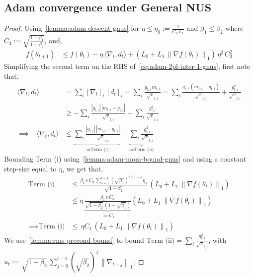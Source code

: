 \documentclass{article}
\newcommand{\ti}[1]{#1_{t,i}}
\newcommand{\norm}[1]{\left\|#1 \right\|}
\newcommand{\tht}{\theta_t}
\newcommand{\thtt}{\theta_{t+1}}
\begin{document}
\subsection{Adam convergence under General NUS}
\label{app:Adam-convergence-gnus}
\adamgnus*
\begin{proof}
Using~\cref{lemma:adam-descent-gnus} for $\eta \leq \bar{\eta}_0 := \frac{1}{C_3 \, L_1}$ and $\beta_1 \leq \beta_2$ where $C_3 := \sqrt{\frac{1 - \beta_1}{1 - \beta_2}}$, and, 
\begin{align}
f(\thtt) & \leq f(\tht) - \eta \, \langle \nabla_t, d_t \rangle +  \left(L_0 + L_1 \, \norm{\nabla f(\tht)}_1 \right) \, \eta^2 \, C^2_3 \label{eq:adam-2pl-inter-1-gnus}    
\end{align}
Simplifying the second term on the RHS of~\cref{eq:adam-2pl-inter-1-gnus}, first note that, 
\begin{align}
\langle \nabla_t, d_t \rangle &= \sum_i [\nabla_t]_i \, [d_t]_i = \sum_i \frac{\ti{g} \, \ti{m}}{\ti{\sqrt{v}}} = \sum_i \frac{\ti{g} \, (\ti{m} - \ti{g})}{\ti{\sqrt{v}}} + \frac{\ti{g^2}}{\ti{\sqrt{v}}} \nonumber \\
& \geq -\sum_i \frac{|\ti{g}| \, |\ti{m} - \ti{g}|}{\ti{\sqrt{v}}} + \sum_i \frac{\ti{g^2}}{\ti{\sqrt{v}}} \nonumber \\
\implies - \langle \nabla_t, d_t \rangle & \leq \underbrace{\sum_i \frac{|\ti{g}| \, |\ti{m} - \ti{g}|}{\ti{\sqrt{v}}}}_{:= \text{Term (i)}} - \underbrace{\sum_i \frac{\ti{g^2}}{\ti{\sqrt{v}}}}_{:= \text{Term (ii)}} \label{eq:adam-2pl-secondterm-1-gnus}
\end{align}
Bounding Term (i) using~\cref{lemma:adam-mom-bound-gnus} and using a constant step-size equal to $\eta$, we get that, 
\begin{align}
\text{Term (i)} & \leq  \frac{\beta_1\,e \, C_3 \, \sum_{s = 1}^{t-1} (\sqrt{\beta_1})^{t-1-s} \, \eta_{s}}{\sqrt{1 - \beta_2}} \, (L_0 + L_1 \, \norm{\nabla f(\tht)}_1 ) \\
& \leq \eta \, \underbrace{\frac{\beta_1\,e \, C_3 \, }{\sqrt{1 - \beta_2} \, (1 - \sqrt{\beta_1})}}_{:= C_1} (L_0 + L_1 \, \norm{\nabla f(\tht)}_1 ) \tag{Since $\eta_s = \eta$} \\
\implies \text{Term (i)} &  \leq \, \eta C_1 \,  (L_0 + L_1 \, \norm{\nabla f(\tht)}_1 ) \label{eq:adam-2pl-secondterm-p1-gnus} 
\end{align}
We use~\cref{lemma:rms-precond-bound} to bound $\text{Term (ii)} = \sum_i \frac{\ti{g^2}}{\ti{\sqrt{v}}}$, with $u_t := \sqrt{1 - \beta_2} \, \sum_{j = 0}^{t-1} (\sqrt{\beta_2})^{j} \, \norm{\nabla_{t-j}}_1$,  

\end{proof}
\end{document}
